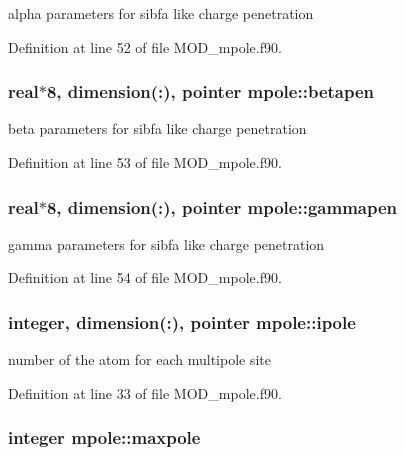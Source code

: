 alpha parameters for sibfa like charge penetration 



Definition at line 52 of file M\-O\-D\-\_\-mpole.\-f90.

\hypertarget{classmpole_afd6e52b962e22a1a1045be134346a2c5}{
\subsubsection[{betapen}]{\setlength{\rightskip}{0pt plus 5cm}real$\ast$8, dimension(\-:), pointer mpole\-::betapen}}\label{classmpole_afd6e52b962e22a1a1045be134346a2c5}


beta parameters for sibfa like charge penetration 



Definition at line 53 of file M\-O\-D\-\_\-mpole.\-f90.

\hypertarget{classmpole_a8f5c183cec3da1ccc232c2eb1c442f55}{
\subsubsection[{gammapen}]{\setlength{\rightskip}{0pt plus 5cm}real$\ast$8, dimension(\-:), pointer mpole\-::gammapen}}\label{classmpole_a8f5c183cec3da1ccc232c2eb1c442f55}


gamma parameters for sibfa like charge penetration 



Definition at line 54 of file M\-O\-D\-\_\-mpole.\-f90.

\hypertarget{classmpole_ac184bff54a099006de6a7772285eb9f8}{
\subsubsection[{ipole}]{\setlength{\rightskip}{0pt plus 5cm}integer, dimension(\-:), pointer mpole\-::ipole}}\label{classmpole_ac184bff54a099006de6a7772285eb9f8}


number of the atom for each multipole site 



Definition at line 33 of file M\-O\-D\-\_\-mpole.\-f90.

\hypertarget{classmpole_ac849d8c6e66420ca0d2e57def5e90d99}{
\subsubsection[{maxpole}]{\setlength{\rightskip}{0pt plus 5cm}integer mpole\-::maxpole}}\label{classmpole_ac849d8c6e66420ca0d2e57def5e90d99}



